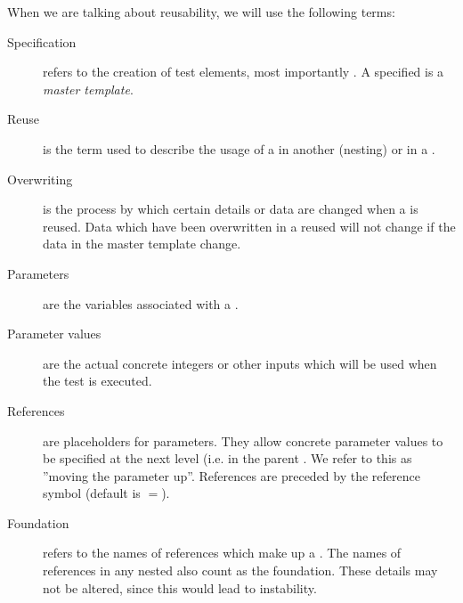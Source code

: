 When we are talking about reusability, we will use the following terms:

\begin{description}
\item[Specification]{refers to the creation of test elements, most importantly \gdcases{}. A specified \gdcase{} is a \emph{master template}.}
\item[Reuse]{is the term used to describe the usage of a \gdcase{} in another \gdcase{} (nesting) or in a \gdsuite{}. }
\item[Overwriting]{is the process by which certain details or data are changed when a \gdcase{} is reused. Data which have been overwritten in a reused \gdcase{} will not change if the data in the master template change. }
\item[Parameters]{are the variables associated with a \gdstep{}.}
\item [Parameter values]{are the actual concrete integers or other inputs 
which will be used when the test is executed.}
\item [References]{are placeholders for parameters. They allow concrete 
parameter values to be specified at the next level (i.e. in the parent \gdcase{}. We refer to this as ''moving the parameter up''. References are preceded by 
the reference symbol (default is $=$). }
\item[Foundation]{refers to the names of references which make up a 
\gdcase{}. The names of references in any nested 
\gdcases{} also count as the foundation. These details may not be altered, since this would lead to 
instability.}
\end{description}

